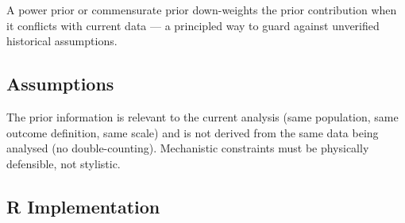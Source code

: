 \documentclass[
]{article}
\begin{document}
A power prior or commensurate prior down-weights the prior contribution
when it conflicts with current data --- a principled way to guard
against unverified historical assumptions.

\subsection{Assumptions}\label{assumptions}

The prior information is relevant to the current analysis (same
population, same outcome definition, same scale) and is not derived from
the same data being analysed (no double-counting). Mechanistic
constraints must be physically defensible, not stylistic.

\subsection{R Implementation}\label{r-implementation}
\end{document}

